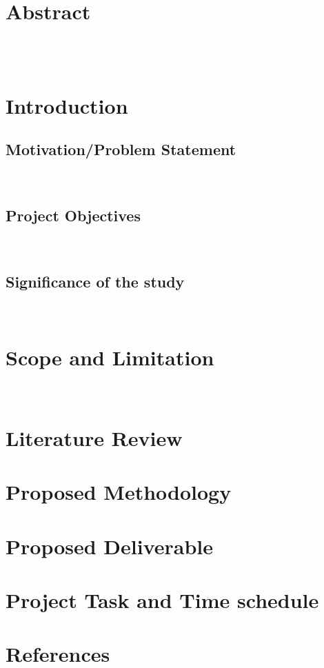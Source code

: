 \documentclass[12pt]{article}
\begin{document}
\newpage
{}
\setcounter{page}{1}
\section*{Abstract}
\\\\
\newpage

\newpage
\tableofcontents
\newpage
\listoffigures
\newpage
\listoftables
\newpage

\section{Introduction}

\subsection{Motivation/Problem Statement}
\\

\subsection{Project Objectives}
\\

\subsection{Significance of the study}
\\

\newpage

\section{Scope and Limitation}
\\
\break

\newpage

\section{Literature Review}

\newpage

\section{Proposed Methodology}

\newpage

\section{Proposed Deliverable}

\newpage

\section{Project Task and Time schedule}

\newpage

\newpage
\section{References}
\printbibliography[heading=none]
\end{document}
